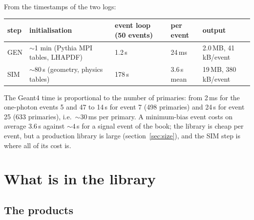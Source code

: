 \documentclass[11pt,a4paper]{article}
\begin{document}
From the timestamps of the two logs:
\begin{center}\footnotesize
\begin{tabular}{lllll}
\toprule
step & initialisation & event loop (50 events) & per event & output \\
\midrule
GEN & $\sim$1 min (Pythia MPI tables, LHAPDF) & 1.2\,s & 24\,ms & 2.0\,MB, 41\,kB/event \\
SIM & $\sim$80\,s (geometry, physics tables) & 178\,s & 3.6\,s mean & 19\,MB, 380\,kB/event \\
\bottomrule
\end{tabular}
\end{center}
The Geant4 time is proportional to the number of primaries: from 2\,ms for the one-photon events 5 and 47 to
14\,s for event 7 (498 primaries) and 24\,s for event 25 (633 primaries), i.e.\ $\sim30$\,ms per primary. A
minimum-bias event costs on average $3.6$\,s against $\sim4$\,s for a signal event of the book; the library is
cheap per event, but a production library is large (section~\ref{sec:size}), and the SIM step is where all of
its cost is.

\section{What is in the library}
\label{sec:content}

\subsection{The products}
\label{sec:products}
\end{document}
